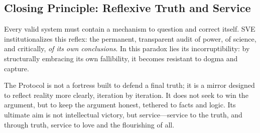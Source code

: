 \documentclass[11pt,a4paper]{article}
\theoremstyle{definition}
\begin{document}
\vspace{1.5em}

\subsection*{\textcolor{headercolor}{Closing Principle: Reflexive Truth and Service}}

Every valid system must contain a mechanism to question and correct itself. SVE institutionalizes this reflex: the permanent, transparent audit of power, of science, and critically, \textit{of its own conclusions}. In this paradox lies its incorruptibility: by structurally embracing its own fallibility, it becomes resistant to dogma and capture.

The Protocol is not a fortress built to defend a final truth; it is a mirror designed to reflect reality more clearly, iteration by iteration. It does not seek to win the argument, but to keep the argument honest, tethered to facts and logic. Its ultimate aim is not intellectual victory, but service—service to the truth, and through truth, service to love and the flourishing of all.

\vspace{2em}
\end{document}

